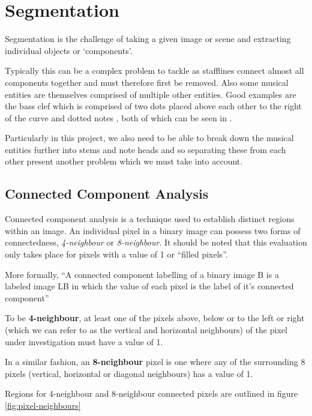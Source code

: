 \section{Segmentation}

Segmentation is the challenge of taking a given image or scene and extracting individual objects or `components'.

Typically this can be a complex problem to tackle as stafflines connect almost all components together and must therefore first be removed. Also some musical entities are themselves comprised of multiple other entities. Good examples are the bass clef which is comprised of two dots placed above each other to the right of the curve and dotted notes , both of which can be seen in .

Particularly in this project, we also need to be able to break down the musical entities further into stems and note heads and so separating these from each other present another problem which we must take into account.

\subsection{Connected Component Analysis}

Connected component analysis is a technique used to establish distinct regions within an image. An individual pixel in a binary image can possess two forms of connectedness, \emph{4-neighbour} or \emph{8-neighbour}. It should be noted that this evaluation only takes place for pixels with a value of 1 or ``filled pixels''.

More formally, ``A connected component labelling of a binary image B is a labeled image LB in which the value of each pixel is the label of it's connected component'' \parencite[pg 69]{shapiro2001computer}

To be \textbf{4-neighbour}, at least one of the pixels above, below or to the left or right (which we can refer to as the vertical and horizontal neighbours) of the pixel under investigation must have a value of 1.

In a similar fashion, an \textbf{8-neighbour} pixel is one where any of the surrounding 8 pixels (vertical, horizontal or diagonal neighbours) has a value of 1.

Regions for 4-neighbour and 8-neighbour connected pixels are outlined in figure \ref{fig:pixel-neighbours}

